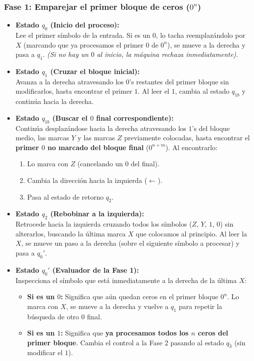 \subsubsection*{Fase 1: Emparejar el primer bloque de ceros ($0^n$)}

\begin{itemize}[leftmargin=*]
    \item \textbf{Estado $q_0$ (Inicio del proceso):}\\
    Lee el primer símbolo de la entrada. Si es un $0$, lo tacha reemplazándolo por $X$ (marcando que ya procesamos el primer $0$ de $0^n$), se mueve a la derecha y pasa a $q_1$. \textit{(Si no hay un $0$ al inicio, la máquina rechaza inmediatamente).}

    \item \textbf{Estado $q_1$ (Cruzar el bloque inicial):}\\
    Avanza a la derecha atravesando los $0$'s restantes del primer bloque sin modificarlos, hasta encontrar el primer $1$. Al leer el $1$, cambia al estado $q_{1b}$ y continúa hacia la derecha.

    \item \textbf{Estado $q_{1b}$ (Buscar el $0$ final correspondiente):}\\
    Continúa desplazándose hacia la derecha atravesando los $1$'s del bloque medio, las marcas $Y$ y las marcas $Z$ previamente colocadas, hasta encontrar el \textbf{primer $0$ no marcado del bloque final} ($0^{n+m}$). Al encontrarlo:
    \begin{enumerate}[label=\arabic*., leftmargin=*]
        \item Lo marca con $Z$ (cancelando un $0$ del final).
        \item Cambia la dirección hacia la izquierda ($\leftarrow$).
        \item Pasa al estado de retorno $q_2$.
    \end{enumerate}

    \item \textbf{Estado $q_2$ (Rebobinar a la izquierda):}\\
    Retrocede hacia la izquierda cruzando todos los símbolos ($Z$, $Y$, $1$, $0$) sin alterarlos, buscando la última marca $X$ que colocamos al principio. Al leer la $X$, se mueve un paso a la derecha (sobre el siguiente símbolo a procesar) y pasa a $q_0'$.

    \item \textbf{Estado $q_0'$ (Evaluador de la Fase 1):}\\
    Inspecciona el símbolo que está inmediatamente a la derecha de la última $X$:
    \begin{itemize}[leftmargin=*]
        \item \textbf{Si es un $0$:} Significa que aún quedan ceros en el primer bloque $0^n$. Lo marca con $X$, se mueve a la derecha y vuelve a $q_1$ para repetir la búsqueda de otro $0$ final.
        \item \textbf{Si es un $1$:} Significa que \textbf{ya procesamos todos los $n$ ceros del primer bloque}. Cambia el control a la Fase 2 pasando al estado $q_3$ (sin modificar el $1$).
    \end{itemize}
\end{itemize}

